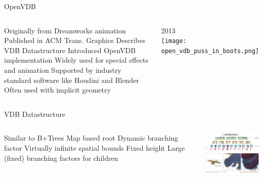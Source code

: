 \placelogofalse
\begin{frame}{OpenVDB}
\begin{columns}
\centering
\begin{outline}
    \1 Originally from Dreamworks animation
    \1 Published in ACM Trans. Graphics
    \2 Describes VDB Datastructure
    \2 Introduced OpenVDB implementation
    \1 Widely used for special effects and animation
      \2 Supported by industry standard software like Houdini and Blender
    \1 Often used with implicit geometry
\end{outline}

\centering
{}
2013 \cite{Museth2013}\\
\vspace{0.5cm}
\texttt{[image: open\_vdb\_puss\_in\_boots.png]} 
\end{columns}
\end{frame}
\placelogotrue

\begin{frame}{VDB Datastructure}
\begin{columns}
\centering
\begin{outline}
    \1 Similar to B+Trees
    \1 Map based root 
      \2 Dynamic branching factor
      \2 Virtually infinite spatial bounds
    \1 Fixed height
    \1 Large (fixed) branching factors for children
\end{outline}

\centering
\includegraphics[width=7.0cm]{open_vdb_data_structure.png} \\
\vspace{0.5cm}
\includegraphics[width=7.0cm]{open_vdb_visual_aid.png} 
\end{columns}
\end{frame}
